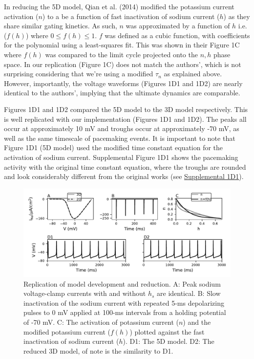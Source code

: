In reducing the 5D model, Qian et al. (2014) modified the potassium current activation ($n$) to a be a function of fast inactivation of sodium current ($h$) as they share similar gating kinetics. As such, $n$ was approximated by a function of $h$ i.e. ($f(h)$) where $0\leq f(h)\leq 1$. $f$ was defined as a cubic function, with coefficients for the polynomial using a least-squares fit. This was shown in their Figure 1C where $f(h)$ was compared to the limit cycle projected onto the $n, h$ phase space. In our replication (Figure 1C) does not match the authors', which is not surprising considering that we're using a modified $\tau_n$ as explained above. However, importantly, the voltage waveforms (Figures 1D1 and 1D2) are nearly identical to the authors', implying that the ultimate dynamics are comparable. 

Figures 1D1 and 1D2 compared the 5D model to the 3D model respectively. This is well replicated with our implementation (Figures 1D1 and 1D2). The peaks all occur at approximately 10 mV and troughs occur at approximately -70 mV, as well as the same timescale of pacemaking events. It is important to note that Figure 1D1 (5D model) used the modified time constant equation for the activation of sodium current. Supplemental Figure 1D1 shows the pacemaking activity with the original time constant equation, where the troughs are rounded and look considerably different from the original works (see \href{https://github.com/mupsh/ReScience\_Qian\_2014/blob/master/figures/figure\_supp\_1D1.pdf}{Supplemental 1D1}).

\begin{figure}
	\centering
	\includegraphics[scale=0.7]{../figures/figure_1.pdf}
	\caption{Replication of model development and reduction. A: Peak sodium voltage-clamp currents with and without $h_s$ are identical. B: Slow inactivation of the sodium current with repeated 5-ms depolarizing pulses to 0 mV applied at 100-ms intervals from a holding potential of -70 mV. C: The activation of potassium current ($n$) and the modified potassium current ($f(h)$) plotted against the fast inactivation of sodium current ($h$). D1: The 5D model. D2: The reduced 3D model, of note is the similarity to D1.}
	\label{fig:1}
\end{figure}

